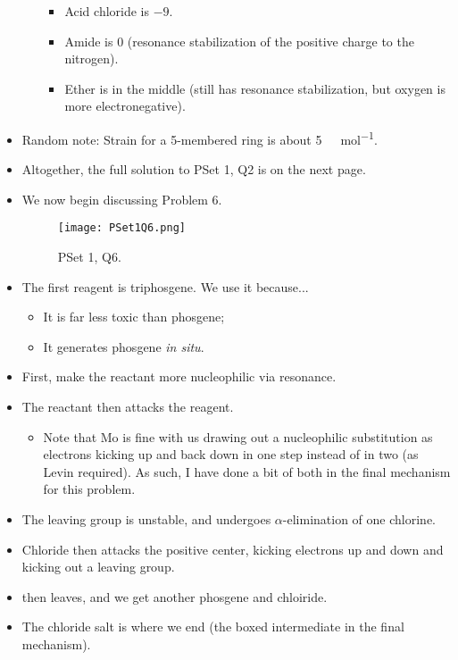 \documentclass[../notes.tex]{subfiles}
\begin{document}
\begin{itemize}
\begin{itemize}
\begin{itemize}
            \item Acid chloride is $-9$.
            \item Amide is $0$ (resonance stabilization of the positive charge to the nitrogen).
            \item Ether is in the middle (still has resonance stabilization, but oxygen is more electronegative).
        \end{itemize}
    \end{itemize}
    \item Random note: Strain for a 5-membered ring is about \SI{5}{\kilo\calorie\per\mole}.
    \item Altogether, the full solution to PSet 1, Q2 is on the next page.
    
    \item We now begin discussing Problem 6.
    \begin{figure}[h!]
        \centering
        \texttt{[image: PSet1Q6.png]}
        \caption{PSet 1, Q6.}
        \label{fig:PSet1Q6}
    \end{figure}
    \item The first reagent is triphosgene. We use it because...
    \begin{itemize}
        \item It is far less toxic than phosgene;
        \item It generates phosgene \emph{in situ}.
    \end{itemize}
    \item First, make the reactant more nucleophilic via resonance.
    \item The reactant then attacks the reagent.
    \begin{itemize}
        \item Note that Mo is fine with us drawing out a nucleophilic substitution as electrons kicking up and back down in one step instead of in two (as Levin required). As such, I have done a bit of both in the final mechanism for this problem.
    \end{itemize}
    \item The leaving group is unstable, and undergoes $\alpha$-elimination of one chlorine.
    \item Chloride then attacks the positive center, kicking electrons up and down and kicking out a leaving group.
    \item {} then leaves, and we get another phosgene and chloiride.
    \item The chloride salt is where we end (the boxed intermediate in the final mechanism).

\end{itemize}
\end{document}
